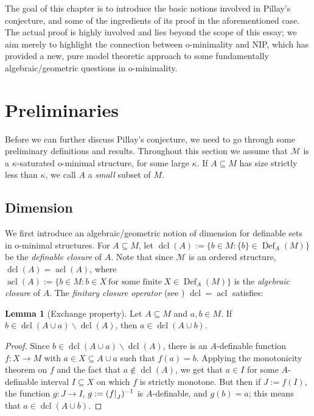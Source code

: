\documentclass[a4paper]{report}
\newcommand{\ind}{\hspace{15pt}}
\newcommand{\M}{\mathcal{M}}
\newcommand\restr[2]{{\left.\kern-\nulldelimiterspace#1\right|_{#2}}}
\DeclareMathOperator{\Def}{Def}
\DeclareMathOperator{\acl}{acl}
\DeclareMathOperator{\dcl}{dcl}
\theoremstyle{definition}
\newtheorem{lem}[thm]{Lemma}
\theoremstyle{remstyle}
\begin{document}
\ind The goal of this chapter is to introduce the basic notions involved in Pillay's conjecture, and some of the ingredients of its proof in the aforementioned case. The actual proof is highly involved and lies beyond the scope of this essay; we aim merely to highlight the connection between o-minimality and NIP, which has provided a new, pure model theoretic approach to some fundamentally algebraic/geometric questions in o-minimality.

\section{Preliminaries}

\ind Before we can further discuss Pillay's conjecture, we need to go through some preliminary definitions and results. Throughout this section we assume that $\M$ is a $\kappa$-saturated o-minimal structure, for some large $\kappa$. If $A\subseteq M$ has size strictly less than $\kappa$, we call $A$ a \emph{small} subset of $M$.

\subsection{Dimension}

\ind We first introduce an algebraic/geometric notion of dimension for definable sets in o-minimal structures. For $A\subseteq M$, let $\dcl(A):=\{b\in M: \{b\}\in\Def_A(M)\}$ be the \emph{definable closure} of $A$. Note that since $\M$ is an ordered structure, $\dcl(A)=\acl(A)$, where $\acl(A):=\{b\in M: b\in X\ \text{for some finite}\ X\in\Def_A(M)\}$ is the \emph{algebraic closure} of $A$. The \emph{finitary closure operator} (see \cite{ominandvariations}) $\dcl=\acl$ satisfies:

\begin{lem}[Exchange property]\label{exchange}
	Let $A\subseteq M$ and $a,b\in M$. If $b\in\dcl(A\cup a)\backslash\dcl(A)$, then $a\in\dcl(A\cup b)$.
\end{lem}

\begin{proof}
	Since $b\in\dcl(A\cup a)\backslash\dcl(A)$, there is an $A$-definable function $f:X\to M$ with $a\in X\subseteq A\cup a$ such that $f(a)=b$. Applying the monotonicity theorem on $f$ and the fact that $a\not\in\dcl(A)$, we get that $a\in I$ for some $A$-definable interval $I\subseteq X$ on which $f$ is strictly monotone. But then if $J:=f(I)$, the function $g:J\to I$, $g:=(\restr{f}{J})^{-1}$ is $A$-definable, and $g(b)=a$; this means that $a\in\dcl(A\cup b)$.
\end{proof}
\end{document}
